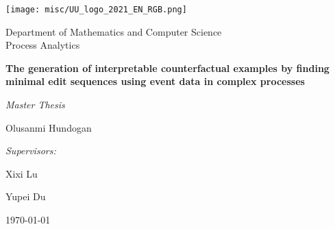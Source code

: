\documentclass[./../paper.tex]{subfiles}
\begin{document}
\begin{titlepage}
    \centering
    \texttt{[image: misc/UU\_logo\_2021\_EN\_RGB.png]}\par
    Department of Mathematics and Computer Science\\
    Process Analytics

    \vspace{3cm}
    {\LARGE\textbf{The generation of interpretable counterfactual examples by finding minimal edit sequences using event data in complex processes}}\par\vspace{0.5cm}
    {\large\textit{Master Thesis}}\par\vspace{1cm}
    {\large Olusanmi Hundogan}\par

    \vfill 

    \emph{Supervisors:}\par
    Xixi Lu\par
    Yupei Du\par

    \today
    \vspace{2cm}


\end{titlepage}
\end{document}

